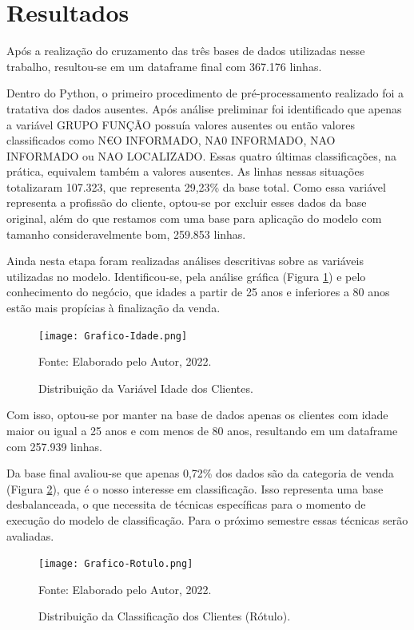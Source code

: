 \section{Resultados}


Após a realização do cruzamento das três bases de dados utilizadas nesse trabalho, resultou-se em um dataframe final com 367.176 linhas.

Dentro do Python, o primeiro procedimento de pré-processamento realizado foi a tratativa dos dados ausentes. Após análise preliminar foi identificado que apenas a variável GRUPO FUNÇÃO possuía valores ausentes ou então valores classificados como N€O INFORMADO, NA0 INFORMADO, NAO INFORMADO ou NAO LOCALIZADO. Essas quatro últimas classificações, na prática, equivalem também a valores ausentes. As linhas nessas situações totalizaram 107.323, que representa 29,23\% da base total. Como essa variável representa a profissão do cliente, optou-se por excluir esses dados da base original, além do que restamos com uma base para aplicação do modelo com tamanho consideravelmente bom, 259.853 linhas.

Ainda nesta etapa foram realizadas análises descritivas sobre as variáveis utilizadas no modelo. Identificou-se, pela análise gráfica (Figura \ref{fig:graf-idade}) e pelo conhecimento do negócio, que idades a partir de 25 anos e inferiores a 80 anos estão mais propícias à finalização da venda.

\begin{figure}[h]
\captionsetup{labelfont=bf,size=normalsize}
    \centering
     \texttt{[image: Grafico-Idade.png]}
\caption{Distribuição da Variável Idade dos Clientes.} {\footnotesize Fonte: Elaborado pelo Autor, 2022.}
\label{fig:graf-idade}
\end{figure}

Com isso, optou-se por manter na base de dados apenas os clientes com idade maior ou igual a 25 anos e com menos de 80 anos, resultando em um dataframe com 257.939 linhas.

Da base final avaliou-se que apenas 0,72\% dos dados são da categoria de venda (Figura \ref{fig:graf-rotulo}), que é o nosso interesse em classificação. Isso representa uma base desbalanceada, o que necessita de técnicas específicas para o momento de execução do modelo de classificação. Para o próximo semestre essas técnicas serão avaliadas.

\begin{figure}[H]
\captionsetup{labelfont=bf,size=normalsize}
    \centering
     \texttt{[image: Grafico-Rotulo.png]}
\caption{Distribuição da Classificação dos Clientes (Rótulo).} {\footnotesize Fonte: Elaborado pelo Autor, 2022.}
\label{fig:graf-rotulo}
\end{figure}


